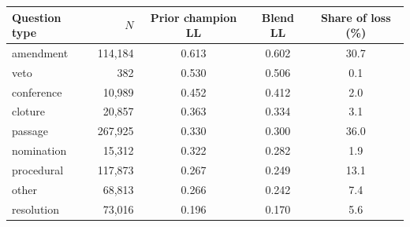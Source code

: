\begin{tabular}{lrccc}
\toprule
Question type & $N$ & Prior champion LL & Blend LL & Share of loss (\%) \\
\midrule
amendment & 114,184 & 0.613 & 0.602 & 30.7 \\
veto & 382 & 0.530 & 0.506 & 0.1 \\
conference & 10,989 & 0.452 & 0.412 & 2.0 \\
cloture & 20,857 & 0.363 & 0.334 & 3.1 \\
passage & 267,925 & 0.330 & 0.300 & 36.0 \\
nomination & 15,312 & 0.322 & 0.282 & 1.9 \\
procedural & 117,873 & 0.267 & 0.249 & 13.1 \\
other & 68,813 & 0.266 & 0.242 & 7.4 \\
resolution & 73,016 & 0.196 & 0.170 & 5.6 \\
\bottomrule
\end{tabular}
